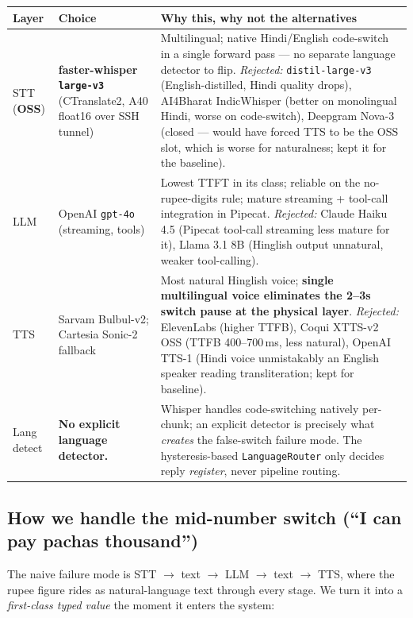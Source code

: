 \documentclass[11pt,a4paper]{article}
\begin{document}
\begin{tabular}{@{}p{2.0cm} p{4.5cm} p{8.5cm}@{}}
\toprule
\textbf{Layer} & \textbf{Choice} & \textbf{Why this, why not the alternatives}\\
\midrule
STT (\textbf{OSS}) & \textbf{faster-whisper \texttt{large-v3}} (CTranslate2, A40 float16 over SSH tunnel) & Multilingual; native Hindi/English code-switch in a single forward pass --- no separate language detector to flip. \emph{Rejected:} \texttt{distil-large-v3} (English-distilled, Hindi quality drops), AI4Bharat IndicWhisper (better on monolingual Hindi, worse on code-switch), Deepgram Nova-3 (closed --- would have forced TTS to be the OSS slot, which is worse for naturalness; kept it for the baseline).\\
\addlinespace
LLM & OpenAI \texttt{gpt-4o} (streaming, tools) & Lowest TTFT in its class; reliable on the no-rupee-digits rule; mature streaming + tool-call integration in Pipecat. \emph{Rejected:} Claude Haiku 4.5 (Pipecat tool-call streaming less mature for it), Llama 3.1 8B (Hinglish output unnatural, weaker tool-calling).\\
\addlinespace
TTS & Sarvam Bulbul-v2; Cartesia Sonic-2 fallback & Most natural Hinglish voice; \textbf{single multilingual voice eliminates the 2--3s switch pause at the physical layer}. \emph{Rejected:} ElevenLabs (higher TTFB), Coqui XTTS-v2 OSS (TTFB 400--700\,ms, less natural), OpenAI TTS-1 (Hindi voice unmistakably an English speaker reading transliteration; kept for baseline).\\
\addlinespace
Lang detect & \textbf{No explicit language detector.} & Whisper handles code-switching natively per-chunk; an explicit detector is precisely what \emph{creates} the false-switch failure mode. The hysteresis-based \texttt{LanguageRouter} only decides reply \emph{register}, never pipeline routing.\\
\bottomrule
\end{tabular}

\subsection*{How we handle the mid-number switch (``I can pay pachas thousand'')}

The naive failure mode is STT $\to$ text $\to$ LLM $\to$ text $\to$ TTS, where the rupee figure rides as natural-language text through every stage. We turn it into a \emph{first-class typed value} the moment it enters the system:
\end{document}
